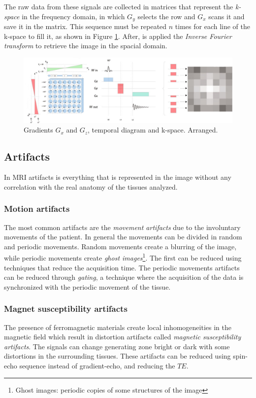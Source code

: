  The raw data from these signals are collected in matrices that represent the \emph{k-space} in the frequency domain, in which $G_y$ selects the row and $G_x$ scans it and save it in the matrix.
 This sequence must be repeated $n$ times for each line of the k-space to fill it, as shown in Figure \ref{fig:gradXY}.
 After, is applied the \emph{Inverse Fourier transform} to retrieve the image in the spacial domain.

 \begin{figure}[h]
    \centering
    \includegraphics[width=1\textwidth]{images/gradxy.png}
    \caption{Gradients $G_x$ and $G_z$, temporal diagram and k-space. \cite{elementiRisonanza} Arranged.}
    \label{fig:gradXY}
 \end{figure}

 \subsection{Artifacts}
 In MRI artifacts is everything that is represented in the image without any correlation with the real anatomy of the tissues analyzed.
  \subsubsection*{Motion artifacts}
  The most common artifacts are the \emph{movement artifacts} due to the involuntary movements of the patient. In general the movements can be divided in random and periodic movements. Random movements create a blurring of the image, while periodic movements create \emph{ghost images}\footnote{Ghost images: periodic copies of some structures of the image}. The first can be reduced using techniques that reduce the acquisition time. The periodic movements artifacts can be reduced through \emph{gating}, a technique where the acquisition of the data is synchronized with the periodic movement of the tissue. \cite{artifacts}
  \subsubsection*{Magnet susceptibility artifacts}
  The presence of ferromagnetic materials create local inhomogeneities in the magnetic field which result in distortion artifacts called \emph{magnetic susceptibility artifacts}. The signals can change generating zone bright or dark with some distortions in the surrounding tissues. These artifacts can be reduced using spin-echo sequence instead of gradient-echo, and reducing the $TE$. \cite{artifacts}
